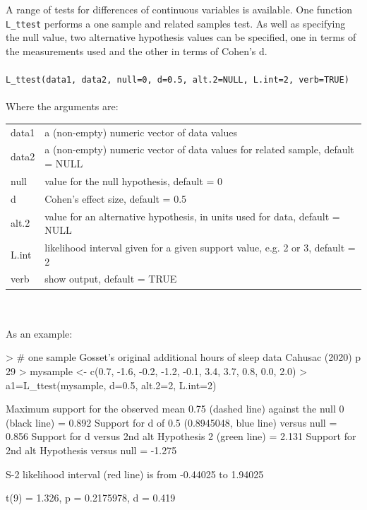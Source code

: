 A range of tests for differences of continuous variables is available. One function \texttt{L\_ttest} performs a one sample and related samples test. As well as specifying the null value, two alternative hypothesis values can be specified, one in terms of the measurements used and the other in terms of Cohen's d.\\\\
\texttt{L\_ttest(data1, data2, null=0, d=0.5, alt.2=NULL, L.int=2, verb=TRUE)}\\\\
Where the arguments are:\\
\begin{tabular}{ll}  
data1 & a (non-empty) numeric vector of data values\\  
data2 & a (non-empty) numeric vector of data values for related sample, default = NULL\\  
null 	& value for the null hypothesis, default = 0\\ 
d 		& Cohen's effect size, default = 0.5\\
alt.2 & value for an alternative hypothesis, in units used for data, default = NULL\\
L.int & likelihood interval given for a given support value, e.g. 2 or 3, default = 2\\
verb 	& show output, default = TRUE\\
\end{tabular}\\
\\
As an example:
\begin{example}
> # one sample Gosset's original additional hours of sleep data Cahusac (2020) p 29 
> mysample <- c(0.7, -1.6, -0.2, -1.2, -0.1, 3.4, 3.7, 0.8, 0.0, 2.0)
> a1=L_ttest(mysample, d=0.5, alt.2=2, L.int=2)

  Maximum support for the observed mean 0.75 (dashed line) against the null 0 (black line) = 0.892
Support for d of 0.5 (0.8945048, blue line) versus null = 0.856
Support for d versus 2nd alt Hypothesis 2 (green line) = 2.131
Support for 2nd alt Hypothesis versus null = -1.275

S-2 likelihood interval (red line) is from -0.44025 to 1.94025

t(9) = 1.326, p = 0.2175978, d = 0.419
\end{example}
